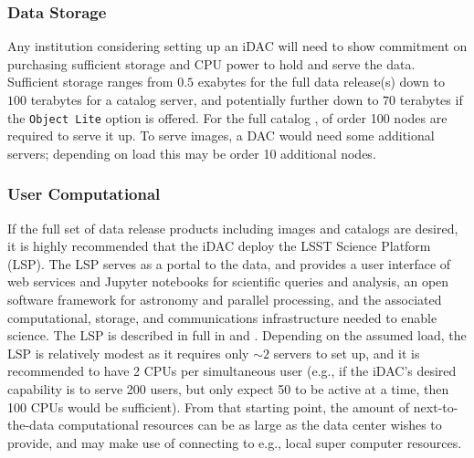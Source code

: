 \subsubsection{Data Storage}
Any institution considering setting up an iDAC will need to show commitment on purchasing sufficient storage and CPU power to hold and serve the data. Sufficient storage ranges from $0.5$ exabytes for the full data release(s) down to $100$ terabytes for a catalog server, and potentially further down to $70$ terabytes if the {\tt Object Lite} option is offered. For the full catalog , of order 100 nodes are required to serve it up. To serve images, a DAC would need some additional servers; depending on load this may be order 10 additional nodes.

\subsubsection{User Computational}
If the full set of data release products including images and catalogs are desired, it is highly recommended that the iDAC deploy the LSST Science Platform (LSP). The LSP serves as a portal to the data, and provides a user interface of web services and Jupyter notebooks for scientific queries and analysis, an open software framework for astronomy and parallel processing, and the associated computational, storage, and communications infrastructure needed to enable science. The LSP is described in full in  and . Depending on the assumed load, the LSP is relatively modest as it requires only $\sim2$ servers to set up, and it is recommended to have 2 CPUs per simultaneous user (e.g., if the iDAC's desired capability is to serve 200 users, but only expect 50 to be active at a time, then 100 CPUs would be sufficient). From that starting point, the amount of next-to-the-data computational resources can be as large as the data center wishes to provide, and may make use of connecting to e.g., local super computer resources.

